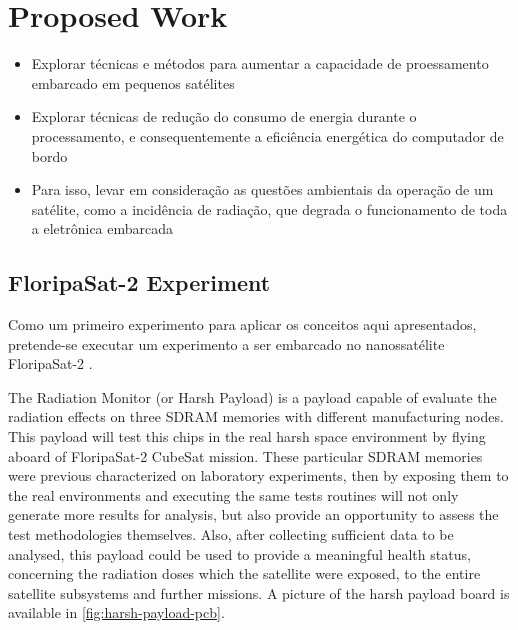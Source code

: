 %
%
%
%
%

%
%
%
%
%

\section{Proposed Work} \label{sec:proposed-work}

\begin{itemize}
    \item Explorar técnicas e métodos para aumentar a capacidade de proessamento embarcado em pequenos satélites
    \item Explorar técnicas de redução do consumo de energia durante o processamento, e consequentemente a eficiência energética do computador de bordo
    \item Para isso, levar em consideração as questões ambientais da operação de um satélite, como a incidência de radiação, que degrada o funcionamento de toda a eletrônica embarcada
\end{itemize}

\subsection{FloripaSat-2 Experiment}

Como um primeiro experimento para aplicar os conceitos aqui apresentados, pretende-se executar um experimento a ser embarcado no nanossatélite FloripaSat-2 \cite{floripasat2}.

The Radiation Monitor (or Harsh Payload) is a payload capable of evaluate the radiation effects on three SDRAM memories with different manufacturing nodes. This payload will test this chips in the real harsh space environment by flying aboard of FloripaSat-2 CubeSat mission. These particular SDRAM memories were previous characterized on laboratory experiments, then by exposing them to the real environments and executing the same tests routines will not only generate more results for analysis, but also provide an opportunity to assess the test methodologies themselves. Also, after collecting sufficient data to be analysed, this payload could be used to provide a meaningful health status, concerning the radiation doses which the satellite were exposed, to the entire satellite subsystems and further missions. A picture of the harsh payload board is available in \autoref{fig:harsh-payload-pcb}.


